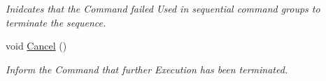 \begin{DoxyCompactItemize}
\begin{DoxyCompactList}\small\item\em Inidcates that the Command failed Used in sequential command groups to terminate the sequence. \end{DoxyCompactList}\item 
\hypertarget{interfacestrange_1_1extensions_1_1command_1_1api_1_1_i_command_afe6c708912de7fe65dbe44d1ba83b547}{void \hyperlink{interfacestrange_1_1extensions_1_1command_1_1api_1_1_i_command_afe6c708912de7fe65dbe44d1ba83b547}{Cancel} ()}\label{interfacestrange_1_1extensions_1_1command_1_1api_1_1_i_command_afe6c708912de7fe65dbe44d1ba83b547}

\begin{DoxyCompactList}\small\item\em Inform the Command that further Execution has been terminated. \end{DoxyCompactList}\end{DoxyCompactItemize}
